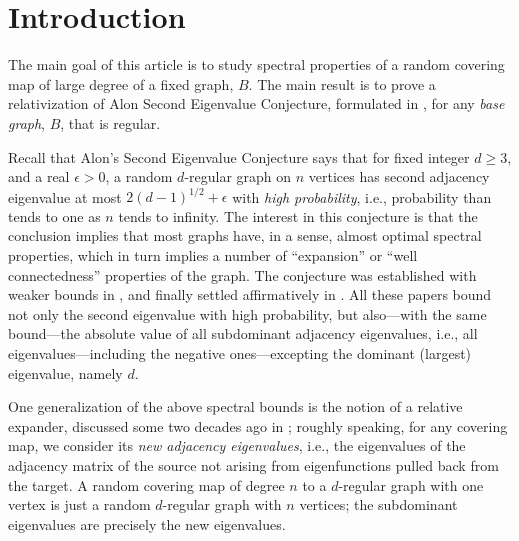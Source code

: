 \documentclass{memo-l}
\theoremstyle{plain}
\theoremstyle{definition}
\numberwithin{section}{chapter}
\numberwithin{equation}{chapter}
\theoremstyle{plain}
\theoremstyle{definition}
\begin{document}
% 

\mainmatter
\setcounter{chapter}{-1}

\chapter{Introduction}
\label{ch:p0}



% 

The main goal of this article
is to study spectral properties
of a random covering map of large degree of a fixed graph, $B$.
The main result is to prove
a relativization of
Alon Second Eigenvalue Conjecture,
formulated in \cite{friedman_relative},
for any {\em base graph}, $B$, that is regular.

Recall that
Alon's Second Eigenvalue Conjecture
says that for
fixed integer $d\ge 3$, and a real $\epsilon>0$,
a random $d$-regular graph on $n$ vertices
has second adjacency eigenvalue at most $2(d-1)^{1/2}+\epsilon$ with
{\em high probability},
i.e., probability than tends to one as $n$ tends to infinity.
The interest in this conjecture is that the conclusion implies that
most graphs have, in a sense, almost optimal spectral properties,
which in turn implies a number of ``expansion'' or ``well connectedness''
properties of the graph.
The conjecture was established with weaker bounds in
\cite{broder,friedman_kahn_szemeredi,friedman_random_graphs}, and finally
settled affirmatively in \cite{friedman_alon}.
All these papers bound not only the second eigenvalue with high
probability, but 
also---with the same bound---the absolute value
of all subdominant
adjacency eigenvalues, i.e., all eigenvalues---including the negative
ones---excepting the dominant (largest)
eigenvalue, namely $d$.

One generalization of the above spectral bounds is
the notion of a relative expander, discussed some two decades ago
in \cite{friedman_relative_boolean};
roughly speaking, for any covering map, we consider its
{\em new adjacency eigenvalues}, i.e., the eigenvalues of the
adjacency matrix of the source not arising from eigenfunctions
pulled back from the target.
A random covering map of degree $n$ to a $d$-regular graph with one vertex
is just a random $d$-regular graph with $n$ vertices;
the subdominant eigenvalues are precisely the new eigenvalues.
\end{document}
